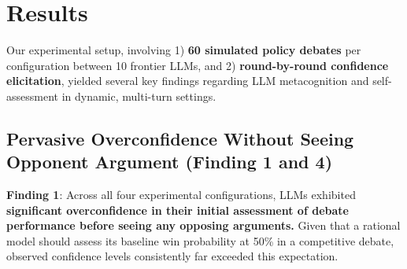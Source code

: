 \documentclass{article}
\begin{document}
\section{Results}
\label{sec:results}

Our experimental setup, involving 1) \textbf{60 simulated policy debates} per configuration between 10 frontier LLMs, and 2) \textbf{round-by-round confidence elicitation}, yielded several key findings regarding LLM metacognition and self-assessment in dynamic, multi-turn settings.

\subsection{Pervasive Overconfidence Without Seeing Opponent Argument (Finding 1 and 4)}
\label{sec:pervasive_overconfidence}

\textbf{Finding 1}: Across all four experimental configurations, LLMs exhibited \textbf{significant overconfidence in their initial assessment of debate performance before seeing any opposing arguments.} Given that a rational model should assess its baseline win probability at 50\% in a competitive debate, observed confidence levels consistently far exceeded this expectation.
\end{document}
